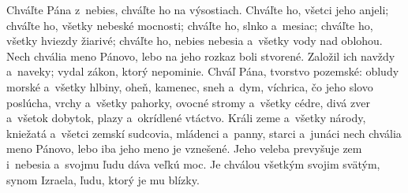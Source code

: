 Chváľte Pána z~nebies,
chváľte ho na výsostiach.
\versseparator
Chváľte ho, všetci jeho anjeli;
chváľte ho, všetky nebeské mocnosti;
\versseparator
chváľte ho, slnko a~mesiac;
chváľte ho, všetky hviezdy žiarivé;
\versseparator
chváľte ho, nebies nebesia
a~všetky vody nad oblohou.
\versseparator
Nech chvália meno Pánovo,
lebo na jeho rozkaz boli stvorené.
\versseparator
Založil ich navždy a~naveky;
vydal zákon, ktorý nepominie.
\versseparator
Chváľ Pána, tvorstvo pozemské:
obludy morské a~všetky hlbiny,
\versseparator
oheň, kamenec, sneh a~dym,
víchrica, čo jeho slovo poslúcha,
\versseparator
vrchy a~všetky pahorky,
ovocné stromy a~všetky cédre,
\versseparator
divá zver a~všetok dobytok,
plazy a~okrídlené vtáctvo.
\versseparator
Králi zeme a~všetky národy,
kniežatá a~všetci zemskí sudcovia,
\versseparator
mládenci a~panny,
starci a~junáci
\versseparator
nech chvália meno Pánovo,
lebo iba jeho meno je vznešené.
\versseparator
Jeho veleba prevyšuje zem i~nebesia
a~svojmu ľudu dáva veľkú moc.
\versseparator
Je chválou všetkým svojim svätým,
synom Izraela, ľudu, ktorý je mu blízky.
